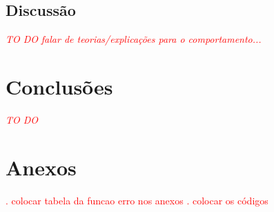 \documentclass[]{politex}
\newcommand\myworries[1]{\textcolor{red}{#1}}
\begin{document}
\section{Discussão}
\myworries{\textit{TO DO}}
\myworries{\textit{falar de teorias/explicações para o comportamento...}}


\chapter{Conclusões}
\myworries{\textit{TO DO}}






\chapter*{Anexos}
\myworries{. colocar tabela da funcao erro nos anexos}
\myworries{. colocar os códigos}
\end{document}
